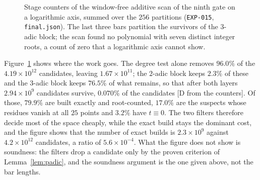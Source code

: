 \documentclass[11pt]{article}
\theoremstyle{definition}
\theoremstyle{remark}
\begin{document}
\begin{figure}[t]
\centering
{}
\caption{Stage counters of the window-free additive scan of the ninth gate on a logarithmic axis,
summed over the $256$ partitions (\texttt{EXP-015}, \texttt{final.json}). The last three bars
partition the survivors of the $3$-adic block; the scan found no polynomial with seven distinct
integer roots, a count of zero that a logarithmic axis cannot show.}
\label{fig:funnel}
\end{figure}

Figure~\ref{fig:funnel} shows where the work goes. The degree test alone removes $96.0\%$
of the $4.19 \times 10^{12}$ candidates, leaving $1.67 \times 10^{11}$; the $2$-adic block keeps
$2.3\%$ of these and the $3$-adic block keeps $76.5\%$ of what remains, so that after both layers
$2.94 \times 10^{9}$ candidates survive, $0.070\%$ of the candidates [D from the counters]. Of those, $79.9\%$
are built exactly and root-counted, $17.0\%$ are the suspects whose residues vanish at all
$25$ points and $3.2\%$ have $t \equiv 0$. The two filters therefore decide most of the
space cheaply, while the exact build stays the dominant cost, and the figure shows that the
number of exact builds is $2.3 \times 10^{9}$ against $4.2 \times 10^{12}$ candidates, a ratio of
$5.6 \times 10^{-4}$. What the figure does not show is soundness: the filters drop a candidate
only by the proven criterion of Lemma~\ref{lem:padic}, and the soundness argument is the one given
above, not the bar lengths.
\end{document}
